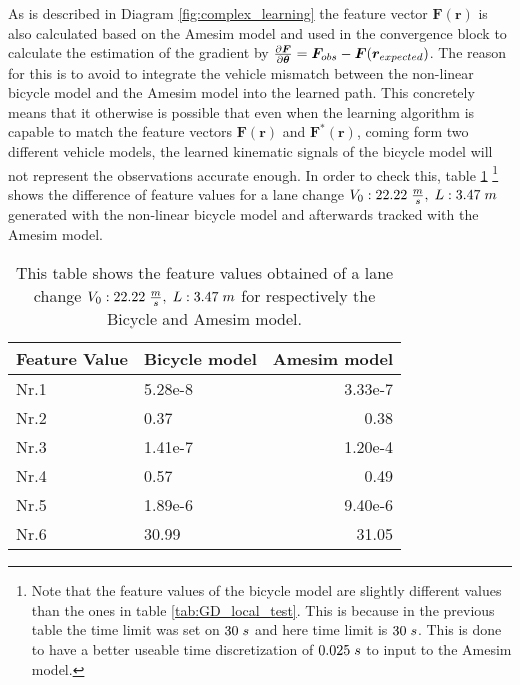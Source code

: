 As is described in Diagram \ref{fig:complex_learning} the feature vector $\bm{F}(\bm{r})$ is also calculated based on the Amesim model and used in the convergence block to calculate the estimation of the gradient by $\pdv{\bm{F}}{\bm{\theta}} = \bm{F}_{obs} - \bm{F}(\bm{r}_{expected})$. The reason for this is to avoid to integrate the vehicle mismatch between the non-linear bicycle model and the Amesim model into the learned path. This concretely means that it otherwise is possible that even when the learning algorithm is capable to match the feature vectors $\bm{F}(\bm{r})$ and  $\bm{F}^*(\bm{r})$, coming form two different vehicle models, the learned kinematic signals of the bicycle model will not represent the observations accurate enough. In order to check this, table \ref{tab:comparinson_models} \footnote{Note that the feature values of the bicycle model are slightly different values than the ones in table \ref{tab:GD_local_test}. This is because in the previous table the time limit was set on $30 \hspace{1mm}s$ and here time limit is $30 \hspace{1mm}s$. This is done to have a better useable time discretization of $0.025\hspace{1mm}s$ to input to the Amesim model.} shows the difference of feature values for a lane change $V_0:22.22\hspace{1mm}\frac{m}{s},\hspace{1mm} L:3.47\hspace{1mm}m$ generated with the non-linear bicycle model and afterwards tracked with the Amesim model.\\

\begin{table}[h!]
	\centering
	\begin{tabular}{@{}llr@{}} \toprule
		Feature Value    & Bicycle model & Amesim model\\ \midrule
		Nr.1       		 & 5.28e-8    & 3.33e-7 \\
		Nr.2       		 & 0.37       & 0.38  \\
		Nr.3       		 & 1.41e-7    & 1.20e-4 \\
		Nr.4       		 & 0.57       & 0.49  \\
		Nr.5       		 & 1.89e-6    & 9.40e-6 \\
		Nr.6       		 & 30.99      & 31.05\\ \bottomrule
	\end{tabular}
	\caption{This table shows the feature values obtained of a lane change $V_0:22.22\hspace{1mm}\frac{m}{s},\hspace{1mm} L:3.47\hspace{1mm}m$ for respectively the Bicycle and Amesim model.}
	\label{tab:comparinson_models}
\end{table}

